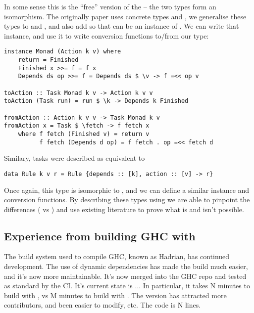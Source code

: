 In some sense this is the ``free'' version of the  \cite{free-applicatives} -- the two types form an isomorphism. The originally paper uses concrete types  and , we generalise these types to  and , and also add  so that  can be an instance of . We can write that  instance, and use it to write conversion functions to/from our  type:

\begin{verbatim}
instance Monad (Action k v) where
    return = Finished
    Finished x >>= f = f x
    Depends ds op >>= f = Depends ds $ \v -> f =<< op v

toAction :: Task Monad k v -> Action k v v
toAction (Task run) = run $ \k -> Depends k Finished

fromAction :: Action k v v -> Task Monad k v
fromAction x = Task $ \fetch -> f fetch x
    where f fetch (Finished v) = return v
          f fetch (Depends d op) = f fetch . op =<< fetch d
\end{verbatim}

Similary, \Make tasks were described as equivalent to

\begin{verbatim}
data Rule k v r = Rule {depends :: [k], action :: [v] -> r}
\end{verbatim}

Once again, this type is isomorphic to , and we can define a similar  instance and conversion functions. By describing these types using  we are able to pinpoint the differences ( vs ) and use existing literature to prove what is and isn't possible.

\subsection{Experience from building GHC with \Shake}


The build system used to compile GHC, known as Hadrian, has continued development. The use of dynamic dependencies has made the build much easier, and it's now more maintainable. It's now merged into the GHC repo and tested as standard by the CI. It's current state is ... In particular, it takes N minutes to build with \Shake, vs M minutes to build with \Make. The \Shake version has attracted more contributors, and been easier to modify, etc. The code is N lines.

